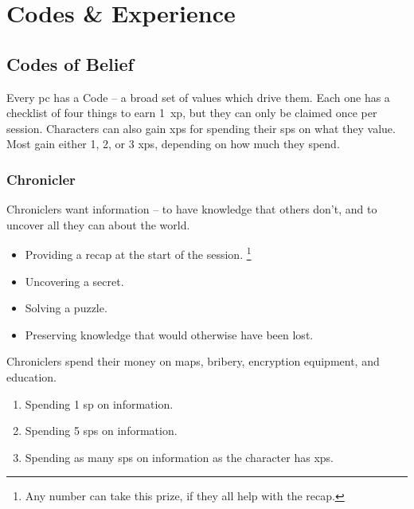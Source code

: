 \chapter[The Soldier's Code]{Codes \& Experience}
\label{codes}

\section{Codes of Belief}
\label{listOfCodes}

\begin{multicols}{2}
\noindent
Every \gls{pc} has a Code -- a broad set of values which drive them.
Each one has a checklist of four things to earn 1~\gls{xp}, but they can only be claimed once per session.
Characters can also gain \glspl{xp} for spending their \glspl{sp} on what they value.
Most gain either 1, 2, or 3 \glspl{xp}, depending on how much they spend.

\subsection{Chronicler}
\label{chronicler}

Chroniclers want information -- to have knowledge that others don't, and to uncover all they can about the world.

\begin{itemize}
  \item
  Providing a recap at the start of the session.%
  \footnote{Any number can take this prize, if they all help with the recap.}
  \item
  Uncovering a secret.
  \item
  Solving a puzzle.
  \item
  Preserving knowledge that would otherwise have been lost.
\end{itemize}

Chroniclers spend their money on maps, bribery, encryption equipment, and education.

\begin{enumerate}
  \item
  Spending 1 \gls{sp} on information.
  \item
  Spending 5 \glspl{sp} on information.
  \item
  Spending as many \glspl{sp} on information as the character has \glspl{xp}.
\end{enumerate}

\null


\end{multicols}
